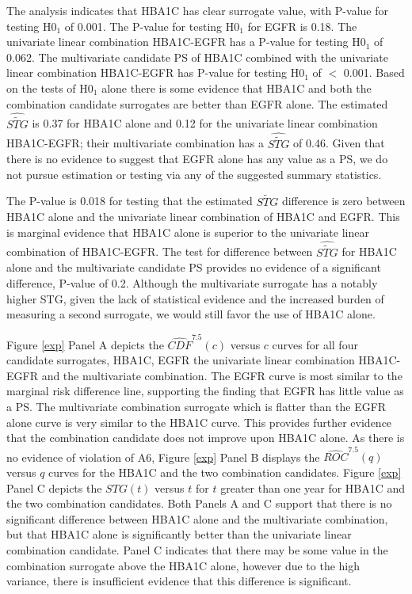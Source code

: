 \documentclass[times, doublespace]{simauth}
\begin{document}
The analysis indicates that HBA1C has clear surrogate value, with P-value for testing H0$_1$ of 0.001. The P-value for testing H0$_1$ for EGFR is 0.18. The univariate linear combination HBA1C-EGFR has a P-value for testing H0$_1$ of 0.062. The multivariate candidate PS of HBA1C combined with the univariate linear combination HBA1C-EGFR has P-value for testing H0$_1$ of $<$ 0.001. Based on the tests of H0$_1$ alone there is some evidence that HBA1C and both the combination candidate surrogates are better than EGFR alone. The estimated $\widehat{\widetilde{STG}}$ is 0.37 for HBA1C alone and 0.12 for the univariate linear combination HBA1C-EGFR; their multivariate combination has a $\widehat{\widetilde{STG}}$ of 0.46. Given that there is no evidence to suggest that EGFR alone has any value as a PS, we do not pursue estimation or testing via any of the suggested summary statistics.

The P-value is 0.018 for testing that the estimated $\widetilde{STG}$ difference is zero between HBA1C alone and the univariate linear combination of HBA1C and EGFR. This is marginal evidence that HBA1C alone is superior to the univariate linear combination of HBA1C-EGFR. The test for difference between $\widehat{\widetilde{STG}}$ for HBA1C alone and the multivariate candidate PS provides no evidence of a significant difference, P-value of 0.2. Although the multivariate surrogate has a notably higher STG, given the lack of statistical evidence and the increased burden of measuring a second surrogate, we would still favor the use of HBA1C alone. 

Figure \ref{exp} Panel A depicts the $\widehat{CDF}^{7.5}(c)$ versus $c$ curves for all four candidate surrogates, HBA1C, EGFR the univariate linear combination HBA1C-EGFR and the multivariate combination. The EGFR curve is most similar to the marginal risk difference line, supporting the finding that EGFR has little value as a PS. The multivariate combination surrogate which is flatter than the EGFR alone curve is very similar to the HBA1C curve. This provides further evidence that the combination candidate does not improve upon HBA1C alone. As there is no evidence of violation of A6, Figure \ref{exp} Panel B displays the $\widehat{ROC}^{7.5}(q)$ versus $q$ curves for the HBA1C and the two combination candidates. Figure \ref{exp} Panel C depicts the $STG(t)$ versus $t$ for $t$ greater than one year for HBA1C and the two combination candidates. Both Panels A and C support that there is no significant difference between HBA1C alone and the multivariate combination, but that HBA1C alone is significantly better than the univariate linear combination candidate. Panel C indicates that there may be some value in the combination surrogate above the HBA1C alone, however due to the high variance, there is insufficient evidence that this difference is significant. 
\end{document}
